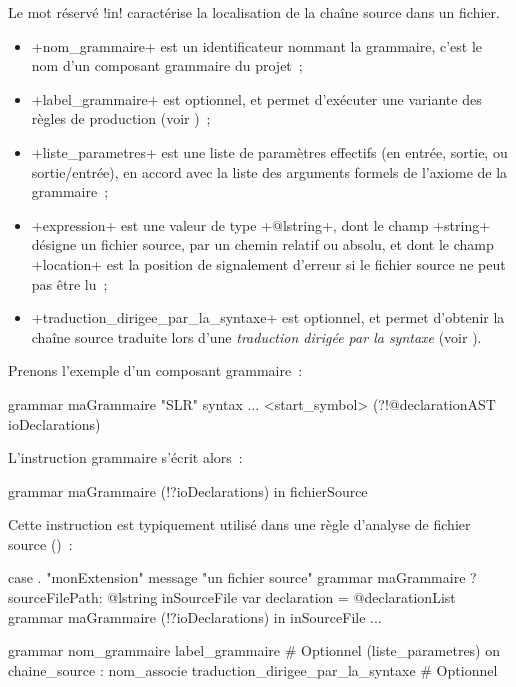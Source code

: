 Le mot réservé \ggst!in! caractérise la localisation de la chaîne source dans un fichier.
\begin{itemize}
  \item \ggst+nom_grammaire+ est un identificateur nommant la grammaire, c'est le nom d'un composant grammaire du projet~;
  \item \ggst+label_grammaire+ est optionnel, et permet d'exécuter une variante des règles de production (voir )~;
  \item \ggst+liste_parametres+ est une liste de paramètres effectifs (en entrée, sortie, ou sortie/entrée), en accord avec la liste des arguments formels de l'axiome de la grammaire~;
  \item \ggst+expression+ est une valeur de type \ggst+@lstring+, dont le champ \ggst+string+ désigne un fichier source, par un chemin relatif ou absolu, et dont le champ \ggst+location+ est la position de signalement d'erreur si le fichier source ne peut pas être lu~;
  \item \ggst+traduction_dirigee_par_la_syntaxe+ est optionnel, et permet d'obtenir la chaîne source traduite lors d'une \emph{traduction dirigée par la syntaxe} (voir ).
\end{itemize}

Prenons l'exemple d'un composant grammaire~:
\begin{galgas3}
grammar maGrammaire "SLR" {
  syntax ...
   <start_symbol> (?!@declarationAST ioDeclarations)
}
\end{galgas3}

L'instruction grammaire s'écrit alors~:
\begin{galgas3}
grammar maGrammaire (!?ioDeclarations) in fichierSource
\end{galgas3}

Cette instruction est typiquement utilisé dans une règle d'analyse de fichier source ()~:

\begin{galgas3}
case . "monExtension"
message "un fichier source"
grammar maGrammaire
?sourceFilePath: @lstring inSourceFile {
  var declaration = @declarationList {}
  grammar maGrammaire (!?ioDeclarations) in inSourceFile
  ...
}
\end{galgas3}




\begin{galgas3box}
grammar
  nom_grammaire
  label_grammaire # Optionnel
  (liste_parametres)
  on chaine_source : nom_associe
  traduction_dirigee_par_la_syntaxe # Optionnel
\end{galgas3box}


